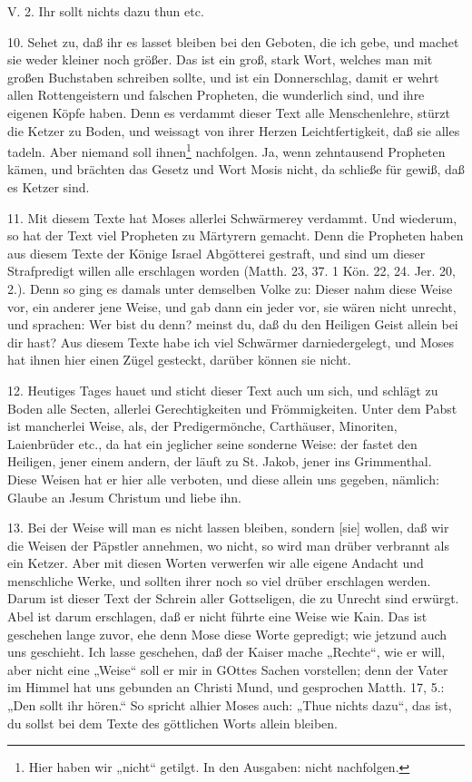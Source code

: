 \begin{schriftzitat}
V. 2. Ihr sollt nichts dazu thun etc.
\end{schriftzitat}

10. Sehet zu, daß ihr es lasset bleiben bei den Geboten, die ich gebe, und machet sie weder kleiner noch größer. Das ist ein groß, stark Wort, welches man mit großen Buchstaben schreiben sollte, und ist ein Donnerschlag, damit er wehrt allen Rottengeistern und falschen Propheten, die wunderlich sind, und ihre eigenen Köpfe haben. Denn es verdammt dieser Text alle Menschenlehre, stürzt die Ketzer zu Boden, und weissagt von ihrer Herzen Leichtfertigkeit, daß sie alles tadeln. Aber niemand soll ihnen\footnote{Hier haben wir „nicht“ getilgt. In den Ausgaben: nicht nachfolgen.} nachfolgen. Ja, wenn zehntausend Propheten kämen, und brächten das Gesetz und Wort Mosis nicht, da schließe für gewiß, daß es Ketzer sind.

11. Mit diesem Texte hat Moses allerlei Schwärmerey verdammt. Und wiederum, so hat der Text viel Propheten zu Märtyrern gemacht. Denn die Propheten haben aus diesem Texte der Könige Israel Abgötterei gestraft, und sind um dieser Strafpredigt willen alle erschlagen worden (Matth. 23, 37. 1 Kön. 22, 24. Jer. 20, 2.). Denn so ging es damals unter demselben Volke zu: Dieser nahm diese Weise vor, ein anderer jene Weise, und gab dann ein jeder vor, sie wären nicht unrecht, und sprachen: Wer bist du denn? meinst du, daß du den Heiligen Geist allein bei dir hast? Aus diesem Texte habe ich viel Schwärmer darniedergelegt, und Moses hat ihnen hier einen Zügel gesteckt, darüber können sie nicht.

12. Heutiges Tages hauet und sticht dieser Text auch um sich, und schlägt zu Boden alle Secten, allerlei Gerechtigkeiten und Frömmigkeiten. Unter dem Pabst ist mancherlei Weise, als, der Predigermönche, Carthäuser, Minoriten, Laienbrüder etc., da hat ein jeglicher seine sonderne Weise: der fastet den Heiligen, jener einem andern, der läuft zu St. Jakob, jener ins Grimmenthal. Diese Weisen hat er hier alle verboten, und diese allein uns gegeben, nämlich: Glaube an Jesum Christum und liebe ihn.

13. Bei der Weise will man es nicht lassen bleiben, sondern [sie] wollen, daß wir die Weisen der Päpstler annehmen, wo nicht, so wird man drüber verbrannt als ein Ketzer. Aber mit diesen Worten verwerfen wir alle eigene Andacht und menschliche Werke, und sollten ihrer noch so viel drüber erschlagen werden. Darum ist dieser Text der Schrein aller Gottseligen, die zu Unrecht sind erwürgt. Abel ist darum erschlagen, daß er nicht führte eine Weise wie Kain. Das ist geschehen lange zuvor, ehe denn Mose diese Worte gepredigt; wie jetzund auch uns geschieht. Ich lasse geschehen, daß der Kaiser mache „Rechte“, wie er will, aber nicht eine „Weise“ soll er mir in GOttes Sachen vorstellen; denn der Vater im Himmel hat uns gebunden an Christi Mund, und gesprochen Matth. 17, 5.: „Den sollt ihr hören.“ So spricht alhier Moses auch: „Thue nichts dazu“, das ist, du sollst bei dem Texte des göttlichen Worts allein bleiben.

